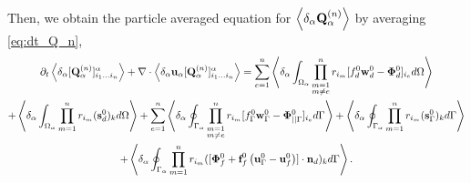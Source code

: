 
Then, we obtain the particle averaged equation for $\left<\delta_\alpha \textbf{Q}_\alpha^{(n)}\right>$ by averaging \ref{eq:dt_Q_n},
\begin{multline*}
    \partial_t \left<\delta_\alpha [\textbf{Q}_\alpha^{(n)}]_{i_1\ldots i_n}^\alpha\right>
    + \mathbf{\nabla}\cdot  \left<\delta_\alpha \textbf{u}_\alpha [\textbf{Q}_\alpha^{(n)}]_{i_1\ldots i_n}^\alpha\right>
    = \sum_{e=1}^{n} 
    \left<\delta_\alpha \int_{\Omega_{\alpha}} 
        \prod^{n}_{\substack{ m=1 \\m \neq e}} r_{i_m} [f_d^0\textbf{w}_d^0  - \bm\Phi_d^0]_{i_e}
     d\Omega\right>\\
    + \left<\delta_\alpha \int_{\Omega_{\alpha}}  \prod_{m=1}^{n} r_{i_m} (\textbf{s}_d^0)_k  d\Omega\right>
    +     
    \sum_{e=1}^{n} 
    \left<\delta_\alpha \oint_{\Gamma_{\alpha}} 
        \prod^{n}_{\substack{ m=1 \\m \neq e}} r_{i_m} [f_\Gamma^0\textbf{w}_\Gamma^0 - \bm\Phi_{||\Gamma}^0]_{i_e}
     d\Gamma\right>
    + \left<\delta_\alpha \oint_{\Gamma_{\alpha}}  \prod_{m=1}^{n} r_{i_m} (\textbf{s}_\Gamma^0)_k  d\Gamma\right>\\
    +\left<\delta_\alpha \oint_{\Gamma_{\alpha}}  \prod_{m=1}^{n} r_{i_m} ([\bm\Phi_f^0 + \textbf{f}_f^0 \left(\textbf{u}_\Gamma^0 - \textbf{u}_f^0\right)]\cdot \textbf{n}_d)_k  d\Gamma\right>. 
\end{multline*}

